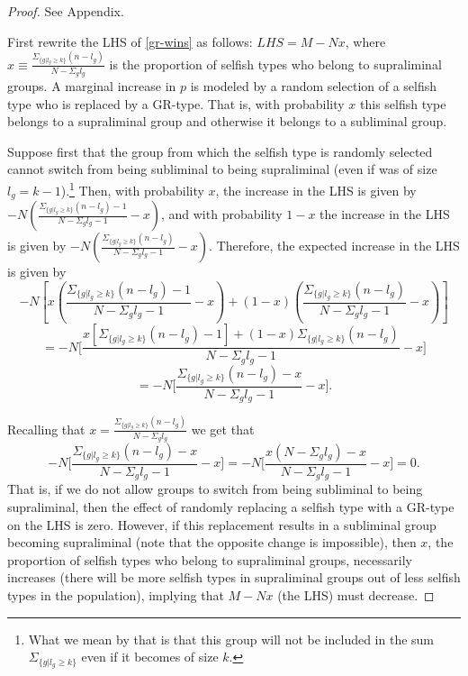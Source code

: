 \documentclass[12pt,a4paper]{article}
\newcommand{\mm}[1]{{\color{red} #1}}
\begin{document}
\begin{proof}
    See Appendix.
    
    \mm{
    First rewrite the LHS of \eqref{gr-wins} as follows: $LHS=M-Nx$, where $x \equiv \frac{\Sigma_{\{g|l_g \geq k\}}(n-l_g)}{N-\Sigma_gl_g}$ is the proportion of selfish types who belong to supraliminal groups.
    A marginal increase in $p$ is modeled by a random selection of a selfish type who is replaced by a GR-type. That is, with probability $x$ this selfish type belongs to a supraliminal group and otherwise it belongs to a subliminal group.

    Suppose first that the group from which the selfish type is randomly selected cannot switch from being subliminal to being supraliminal (even if was of size $l_g=k-1$).\footnote{\mm{What we mean by that is that this group will not be included in the sum $\Sigma_{\{g|l_g \geq k\}}$ even if it becomes of size $k$.}}
    Then, with probability $x$, the increase in the LHS is given by $-N(\frac{\Sigma_{\{g|l_g \geq k\}}(n-l_g)-1}{N-\Sigma_gl_g-1}-x)$, and with probability $1-x$ the increase in the LHS is given by $-N(\frac{\Sigma_{\{g|l_g \geq k\}}(n-l_g)}{N-\Sigma_gl_g-1}-x)$.
    Therefore, the expected increase in the LHS is given by
    \begin{equation*}
        -N[x(\frac{\Sigma_{\{g|l_g \geq k\}}(n-l_g)-1}{N-\Sigma_gl_g-1}-x)+(1-x)(\frac{\Sigma_{\{g|l_g \geq k\}}(n-l_g)}{N-\Sigma_gl_g-1}-x)] 
    \end{equation*}
    \begin{equation*}
        =-N\big[\frac{x[\Sigma_{\{g|l_g \geq k\}}(n-l_g)-1]+(1-x)\Sigma_{\{g|l_g \geq k\}}(n-l_g)}{N-\Sigma_gl_g-1}-x \big]
    \end{equation*}
    \begin{equation*}
        =-N\big[\frac{\Sigma_{\{g|l_g \geq k\}}(n-l_g)-x}{N-\Sigma_gl_g-1}-x \big].
    \end{equation*}

    Recalling that $x=\frac{\Sigma_{\{g|l_g \geq k\}}(n-l_g)}{N-\Sigma_gl_g}$ we get that
    \begin{equation*}
       -N\big[\frac{\Sigma_{\{g|l_g \geq k\}}(n-l_g)-x}{N-\Sigma_gl_g-1}-x \big]= -N\big[\frac{x(N-\Sigma_gl_g)-x}{N-\Sigma_gl_g-1}-x \big]=0.
    \end{equation*}
   That is, if we do not allow groups to switch from being subliminal to being supraliminal, then the effect of randomly replacing a selfish type with a GR-type on the LHS is zero. However, if this replacement results in a subliminal group becoming supraliminal (note that the opposite change is impossible), then $x$, the proportion of selfish types who belong to supraliminal groups, necessarily increases (there will be more selfish types in supraliminal groups out of less selfish types in the population), implying that $M-Nx$ (the LHS) must decrease.
            }
\end{proof}
\end{document}
